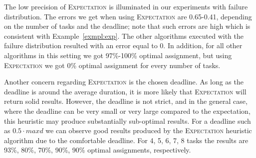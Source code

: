 \documentclass[letterpaper]{article} %
\newcommand{\expectation}{\textsc{Expectation}\xspace}
\newcommand\Roni[1]{\nb{\textbf{Roni:}}{blue}{#1}}
\newcommand{\commentout}[1]{}
\begin{document}
The low precision of \expectation is illuminated in our experiments with failure distribution. The errors we get when using \expectation are 0.65-0.41, depending on the number of tasks and the deadline; note that such errors are high which is consistent with Example~\ref{exmpl:exp}. 
The other algorithms executed with the failure distribution resulted with an error equal to 0. %
In addition, for all other algorithms in this setting  we got 97\%-100\% optimal assignment, but using \expectation we got 0\% optimal assignment for every number of tasks. 
\commentout{
\begin{figure}[h!]
	\scriptsize	
	\begin{tikzpicture}
	\begin{axis}[
	scale=0.7,
	xlabel={\#Tasks},
	ylabel near ticks,
	ylabel={Error},
	xmin=4, xmax=8,
	ymin=0, ymax=1,
	legend pos=outer north east,
	ymajorgrids=true,
	grid style=dashed,
	]
	

    \addplot[
	color=red,
	mark=square,
	]
	coordinates {
		(4 , 0.66) 
		(5 , 0.63) 
		(6 , 0.58)
		(7 , 0.57) 
		(8 , 0.51)
		

	};
	\addlegendentry{\expectation}
	
	\end{axis}
	\end{tikzpicture}
	\caption{Error comparison of the heuristic algorithms for deadline $0.75\cdot maxd$ and failure distribution}\label{075faile}
\end{figure}
}
Another concern regarding \expectation is the chosen deadline. As long as the deadline is around the average duration, it is more likely that \expectation will return solid results. However, the deadline is not strict, and in the general case, where the deadline can be very small or very large compared to the expectation, this heuristic may produce substantially sub-optimal results. For a deadline such as $0.5\cdot maxd$ we can observe good results produced by the \expectation heuristic algorithm due to the comfortable deadline. For 4, 5, 6, 7, 8 tasks the results are 93\%, 80\%, 70\%, 90\%, 90\% optimal assignments, respectively.
\end{document}
